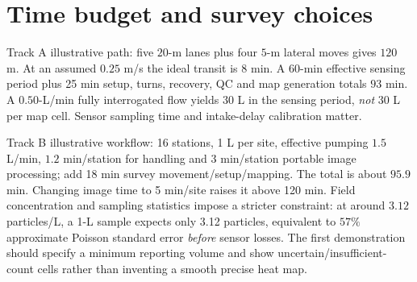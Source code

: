 \documentclass[10pt,a4paper]{article}
\begin{document}
\section{Time budget and survey choices}
Track A illustrative path: five $20$-m lanes plus four $5$-m lateral moves gives $120$ m. At an assumed $0.25$ m/s the ideal transit is $8$ min. A 60-min effective sensing period plus 25 min setup, turns, recovery, QC and map generation totals $93$ min. A $0.50$-L/min fully interrogated flow yields $30$ L in the sensing period, \emph{not} $30$ L per map cell. Sensor sampling time and intake-delay calibration matter.

Track B illustrative workflow: 16 stations, 1 L per site, effective pumping $1.5$ L/min, $1.2$ min/station for handling and $3$ min/station portable image processing; add 18 min survey movement/setup/mapping. The total is about $95.9$ min. Changing image time to 5 min/site raises it above 120 min. Field concentration and sampling statistics impose a stricter constraint: at around $3.12$ particles/L, a 1-L sample expects only 3.12 particles, equivalent to $57\%$ approximate Poisson standard error \emph{before} sensor losses. The first demonstration should specify a minimum reporting volume and show uncertain/insufficient-count cells rather than inventing a smooth precise heat map.
\end{document}
